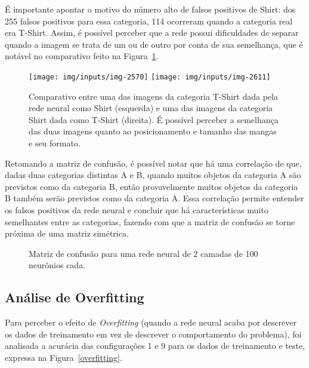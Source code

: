 \documentclass[twocolumn]{article}
\begin{document}
    É importante apontar o motivo do número alto de falsos positivos de Shirt:
    dos 255 falsos positivos para essa categoria, 114 ocorreram quando a
    categoria real era T-Shirt. Assim, é possível perceber que a rede possui
    dificuldades de separar quando a imagem se trata de um ou de outro por
    conta de sua semelhança, que é notável no comparativo feito na
    Figura~\ref{shirt-compare}.

    \begin{figure}[h!]
        \centering{}
        \texttt{[image: img/inputs/img-2570]}
        \texttt{[image: img/inputs/img-2611]}
        \caption{%
            Comparativo entre uma das imagens da categoria T-Shirt dada pela
            rede neural como Shirt (esquerda) e uma das imagens da categoria
            Shirt dada como T-Shirt (direita). É possível perceber a semelhança
            das duas imagens quanto ao posicionamento e tamanho das mangas e
            seu formato.\label{shirt-compare}
        }
    \end{figure}

    Retomando a matriz de confusão, é possível notar que há uma correlação de
    que, dadas duas categorias distintas A e B, quando muitos objetos da
    categoria A são previstos como da categoria B, então provavelmente muitos
    objetos da categoria B também serão previstos como da categoria A. Essa
    correlação permite entender os falsos positivos da rede neural e concluir
    que há características muito semelhantes entre as categorias, fazendo com
    que a matriz de confusão se torne próxima de uma matriz simétrica.

    \begin{figure}[ht]
        \centering{}
        \def\svgwidth{\columnwidth}
        
        \caption{%
            Matriz de confusão para uma rede neural de 2 camadas de 100
            neurônios cada.\label{conf-matrix}
        }
    \end{figure}

    \subsection{Análise de Overfitting}

    Para perceber o efeito de \textit{Overfitting} (quando a rede neural acaba
    por descrever os dados de treinamento em vez de descrever o comportamento
    do problema), foi analisada a acurácia das configurações 1 e 9 para os
    dados de treinamento e teste, expressa na Figura~\ref{overfitting}.
\end{document}
